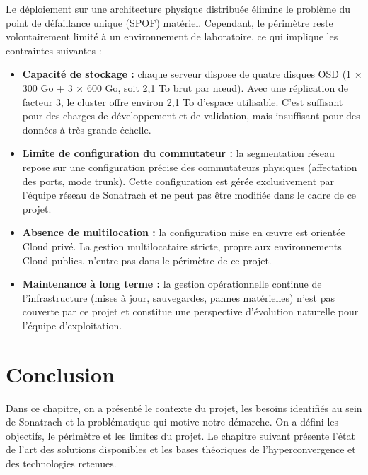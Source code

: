\par Le déploiement sur une architecture physique distribuée élimine le problème du point de défaillance unique (SPOF) matériel. Cependant, le périmètre reste volontairement limité à un environnement de laboratoire, ce qui implique les contraintes suivantes :\\

\begin{itemize}

    \item \textbf{Capacité de stockage :} chaque serveur dispose de quatre disques OSD (1 × 300 Go + 3 × 600 Go, soit 2,1 To brut par n\oe{}ud). Avec une réplication de facteur 3, le cluster offre environ 2,1 To d'espace utilisable. C'est suffisant pour des charges de développement et de validation, mais insuffisant pour des données à très grande échelle.

    \item \textbf{Limite de configuration du commutateur :} la segmentation réseau repose sur une configuration précise des commutateurs physiques (affectation des ports, mode trunk). Cette configuration est gérée exclusivement par l'équipe réseau de Sonatrach et ne peut pas être modifiée dans le cadre de ce projet.

    \item \textbf{Absence de multilocation :} la configuration mise en \oe{}uvre est orientée Cloud privé. La gestion multilocataire stricte, propre aux environnements Cloud publics, n'entre pas dans le périmètre de ce projet.

    \item \textbf{Maintenance à long terme :} la gestion opérationnelle continue de l'infrastructure (mises à jour, sauvegardes, pannes matérielles) n'est pas couverte par ce projet et constitue une perspective d'évolution naturelle pour l'équipe d'exploitation.

\end{itemize}

\section{Conclusion}

\par Dans ce chapitre, on a présenté le contexte du projet, les besoins identifiés au sein de Sonatrach et la problématique qui motive notre démarche. On a défini les objectifs, le périmètre et les limites du projet. Le chapitre suivant présente l'état de l'art des solutions disponibles et les bases théoriques de l'hyperconvergence et des technologies retenues.\\
